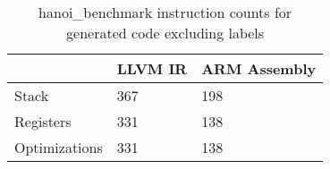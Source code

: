 \begin{table}[h!]
\centering
\begin{tabular}{p{}p{}p{}}
  \hline
 & LLVM IR & ARM Assembly \\ 
  \hline
Stack & 367 & 198 \\ 
  Registers & 331 & 138 \\ 
  Optimizations & 331 & 138 \\ 
   \hline
\end{tabular}
\caption{hanoi\_benchmark instruction counts for generated code excluding labels}
\end{table}
